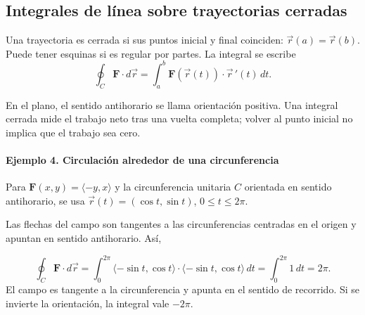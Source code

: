 \subsection{Integrales de línea sobre trayectorias cerradas}

Una trayectoria es cerrada si sus puntos inicial y final coinciden: $\vec r(a)=\vec r(b)$. Puede tener esquinas si es regular por partes. La integral se escribe
\[
\oint_C\mathbf{F}\cdot d\vec r
=\int_a^b\mathbf{F}(\vec r(t))\cdot\vec r\,'(t)\,dt.
\]
\begin{samepage}
En el plano, el sentido antihorario se llama orientación positiva. Una integral cerrada mide el trabajo neto tras una vuelta completa; volver al punto inicial no implica que el trabajo sea cero.\par
\end{samepage}

\begin{samepage}
\paragraph{Ejemplo 4. Circulación alrededor de una circunferencia}
Para $\mathbf{F}(x,y)=\langle-y,x\rangle$ y la circunferencia unitaria $C$ orientada en sentido antihorario, se usa $\vec r(t)=(\cos t,\sin t)$, $0\leq t\leq2\pi$.

\begingroup
\shorthandoff{>}
\begin{center}
\end{center}
\endgroup

Las flechas del campo son tangentes a las circunferencias centradas en el origen y apuntan en sentido antihorario. Así,
\end{samepage}
\[
\oint_C\mathbf{F}\cdot d\vec r
=\int_0^{2\pi}\langle-\sin t,\cos t\rangle
\cdot\langle-\sin t,\cos t\rangle\,dt
=\int_0^{2\pi}1\,dt=2\pi.
\]
El campo es tangente a la circunferencia y apunta en el sentido de recorrido. Si se invierte la orientación, la integral vale $-2\pi$.

